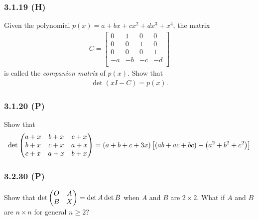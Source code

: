\documentclass[pdf,9pt,t]{beamer}
\begin{document}
\begin{frame}[fragile]
   \frametitle{3.1.19 (H)}
   \begin{problem}
       Given the polynomial $p(x) = a+bx+cx^2+dx^3+x^4$, the matrix
      \begin{align*}
	  C=
	    \begin{bmatrix}
		0  & 1  & 0  & 0\\
		0  & 0  & 1  & 0\\
		0  & 0  & 0  & 1\\
		-a & -b & -c & -d\\
	    \end{bmatrix}
      \end{align*}
      is called the {\it companion matrix} of $p(x)$. Show that
      \begin{align*}
	  \det(xI-C) = p(x).
      \end{align*}
   \end{problem}
\end{frame}

\begin{frame}[fragile]
    \frametitle{3.1.20 (P)}
    \begin{problem}
	Show that
	\begin{align*}
	    \det \begin{pmatrix}
		a+x & b+x & c+x \cr
		b+x & c+x & a+x \cr
		c+x & a+x & b+x \cr
	    \end{pmatrix}
	    =\left(a+b+c+3x\right)\left[\left(ab+ac+bc\right)-\left(a^2+b^2+c^2\right)\right]
	\end{align*}
    \end{problem}
\end{frame}

\begin{frame}[fragile,t]
    \frametitle{3.2.30 (P)}
	\begin{problem}
	    Show that $\det \begin{pmatrix} O & A\cr B & X \end{pmatrix} = \det A \det B$ when $A$ and $B$ are $2\times 2$.
	    What if $A$ and $B$ are $n \times n$ for general $n\ge 2$?
	\end{problem}
\end{frame}
\end{document}
